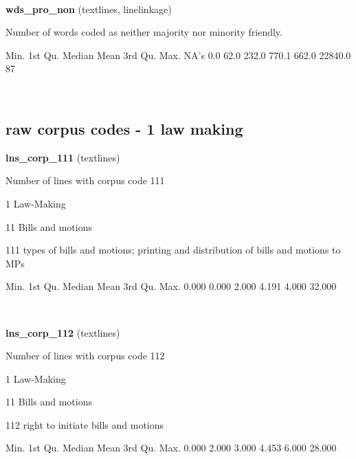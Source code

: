 \documentclass[]{article}
\newenvironment{Shaded}{\begin{snugshade}}{\end{snugshade}}
\newcommand{\FloatTok}[1]{\textcolor[rgb]{0.00,0.00,0.81}{{#1}}}
\newcommand{\StringTok}[1]{\textcolor[rgb]{0.31,0.60,0.02}{{#1}}}
\newcommand{\NormalTok}[1]{{#1}}
\begin{document}
~

\vspace{1em}

\textbf{wds\_pro\_non} (textlines, linelinkage)

Number of words coded as neither majority nor minority friendly.

\begin{Shaded}
\begin{Highlighting}[]
   \NormalTok{Min. 1st Qu.  Median    Mean 3rd Qu.    Max.    NA}\StringTok{'s }
\StringTok{    0.0    62.0   232.0   770.1   662.0 22840.0      87 }
\end{Highlighting}
\end{Shaded}

~

\vspace{1em}

\subsection{raw corpus codes - 1 law
making}\label{raw-corpus-codes---1-law-making}

\textbf{lns\_corp\_111} (textlines)

Number of lines with corpus code 111

1 Law-Making

11 Bills and motions

111 types of bills and motions; printing and distribution of bills and
motions to MPs

\begin{Shaded}
\begin{Highlighting}[]
   \NormalTok{Min. 1st Qu.  Median    Mean 3rd Qu.    Max. }
  \FloatTok{0.000}   \FloatTok{0.000}   \FloatTok{2.000}   \FloatTok{4.191}   \FloatTok{4.000}  \FloatTok{32.000} 
\end{Highlighting}
\end{Shaded}

~

\vspace{1em}

\textbf{lns\_corp\_112} (textlines)

Number of lines with corpus code 112

1 Law-Making

11 Bills and motions

112 right to initiate bills and motions

\begin{Shaded}
\begin{Highlighting}[]
   \NormalTok{Min. 1st Qu.  Median    Mean 3rd Qu.    Max. }
  \FloatTok{0.000}   \FloatTok{2.000}   \FloatTok{3.000}   \FloatTok{4.453}   \FloatTok{6.000}  \FloatTok{28.000} 
\end{Highlighting}
\end{Shaded}
\end{document}
